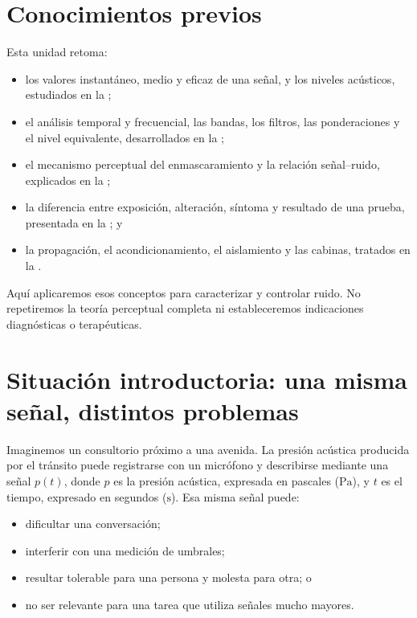 \section{Conocimientos previos}
\label{sec:u10-previos}

Esta unidad retoma:
\begin{itemize}
    \item los valores instantáneo, medio y eficaz de una señal, y los niveles
    acústicos, estudiados en la ;
    \item el análisis temporal y frecuencial, las bandas, los filtros, las
    ponderaciones y el nivel equivalente, desarrollados en la
    ;
    \item el mecanismo perceptual del enmascaramiento y la relación
    señal--ruido, explicados en la ;
    \item la diferencia entre exposición, alteración, síntoma y resultado de
    una prueba, presentada en la ; y
    \item la propagación, el acondicionamiento, el aislamiento y las cabinas,
    tratados en la .
\end{itemize}

Aquí aplicaremos esos conceptos para caracterizar y controlar ruido. No
repetiremos la teoría perceptual completa ni estableceremos indicaciones
diagnósticas o terapéuticas.

\section{Situación introductoria: una misma señal, distintos problemas}
\label{sec:u10-situacion}

Imaginemos un consultorio próximo a una avenida. La presión acústica producida
por el tránsito puede registrarse con un micrófono y describirse mediante una
señal \(p(t)\), donde \(p\) es la presión acústica, expresada en pascales
(\(\mathrm{Pa}\)), y \(t\) es el tiempo, expresado en segundos
(\(\mathrm{s}\)). Esa misma señal puede:
\begin{itemize}
    \item dificultar una conversación;
    \item interferir con una medición de umbrales;
    \item resultar tolerable para una persona y molesta para otra; o
    \item no ser relevante para una tarea que utiliza señales mucho mayores.
\end{itemize}

